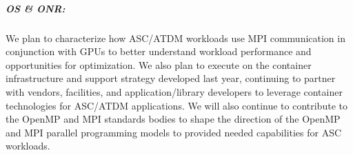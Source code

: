 \subparagraph{OS \& ONR:} We plan to characterize how ASC/ATDM workloads use MPI communication in conjunction with GPUs to better understand workload performance and opportunities for optimization. We also plan to execute on the container infrastructure and support strategy developed last year, continuing to partner with vendors, facilities, and application/library developers to leverage container technologies for ASC/ATDM applications. We will also continue to contribute to the OpenMP and MPI standards bodies to shape the direction of the OpenMP and MPI parallel programming models to provided needed capabilities for ASC workloads.
